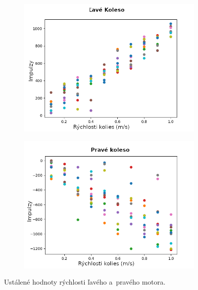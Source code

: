 \begin{figure}[!htbp]
	\begin{subfigure}{0.5\textwidth}
		\includegraphics[width=\textwidth]{img/Left_wheel_2.png}
	\end{subfigure}
	\hfill
	\begin{subfigure}{0.5\textwidth}
		\includegraphics[width=\textwidth]{img/Right_wheel_2.png}
	\end{subfigure}
	\caption{Ustálené hodnoty rýchlosti ľavého a~pravého motora. }
	\label{fig:lavePraveKoleso}
\end{figure}

